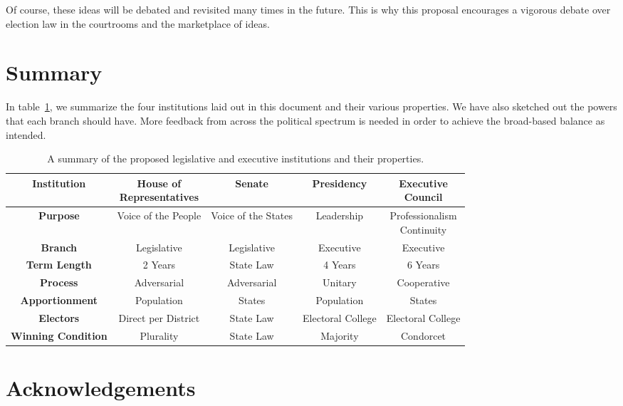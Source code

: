 \documentclass{article}
\begin{document}
Of course, these ideas will be debated and revisited many times in the future. This is why this proposal encourages a vigorous debate over election law in the courtrooms and the marketplace of ideas.

\section{Summary}

In table~\ref{table:institutions}, we summarize the four institutions laid out in this document and their various properties. We have also sketched out the powers that each branch should have. More feedback from across the political spectrum is needed in order to achieve the broad-based balance as intended.

\begin{table}[ht]
\centering
\renewcommand{\arraystretch}{1.5}
\begin{tabular}{|c|c|c|c|c|}
\hline
\textbf{Institution} & \makecell{House of \\ Representatives} & Senate & Presidency & \makecell{Executive \\ Council}  \\
\hline
\textbf{Purpose} & Voice of the People & Voice of the States & Leadership & \makecell{Professionalism \\ Continuity} \\
\hline
\textbf{Branch} & Legislative & Legislative & Executive & Executive \\
\hline
\textbf{Term Length} & 2 Years & State Law & 4 Years & 6 Years \\
\hline
\textbf{Process} & Adversarial & Adversarial & Unitary & Cooperative \\
\hline
\textbf{Apportionment} & Population & States & Population & States  \\
\hline
\textbf{Electors} & Direct per District & State Law  & Electoral College & Electoral College  \\
\hline
\textbf{Winning Condition} & Plurality & State Law & Majority & Condorcet  \\
\hline
\end{tabular}
\caption{A summary of the proposed legislative and executive institutions and their properties. }
\label{table:institutions}
\end{table}

\section*{Acknowledgements}
\end{document}
